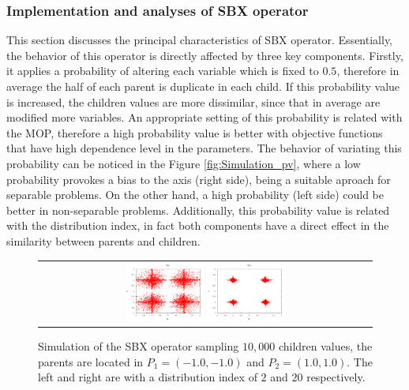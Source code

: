 \subsubsection{Implementation and analyses of SBX operator}
This section discusses the principal characteristics of SBX operator.
%
Essentially, the behavior of this operator is directly affected by three key components.
%
Firstly, it applies a probability of altering each variable which is fixed to $0.5$, therefore in average the half of each parent is duplicate in each child.
%
If this probability value is increased, the children values are more dissimilar, since that in average are modified more variables.
%
An appropriate setting of this probability is related with the MOP, therefore a high probability value is better with objective functions that have high dependence level in the parameters.
%
The behavior of variating this probability can be noticed in the Figure \ref{fig:Simulation_pv}, where a low probability provokes a bias to the axis (right side), being a suitable aproach for separable problems.
%
On the other hand, a high probability (left side) could be better in non-separable problems.
%
Additionally, this probability value is related with the distribution index, in fact both components have a direct effect in the similarity between parents and children.
%
%
\begin{figure}[t]
\centering
\begin{tabular}{c}
   \includegraphics[width=0.24\textwidth]{img/SBX_eta_2.png}  %
   \includegraphics[width=0.24\textwidth]{img/SBX_eta_20.png} 
\end{tabular}
\caption{Simulation of the SBX operator sampling $10,000$ children values, the parents are located in $P_1=(-1.0, -1.0)$ and $P_2=(1.0, 1.0)$. The left and right are with a distribution index of $2$ and $20$ respectively.}
\label{fig:Simulation_Case_3}
\end{figure}
